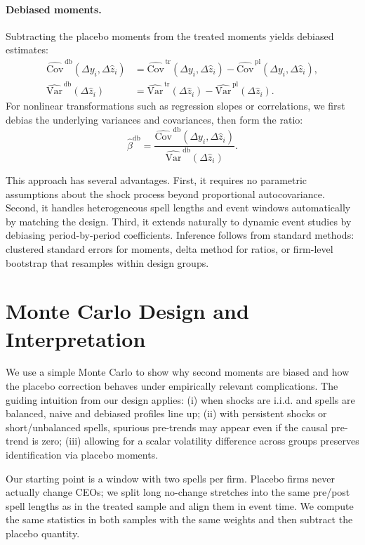 \documentclass[11pt,a4paper]{article}
\newcommand{\Var}{\text{Var}}
\newcommand{\Cov}{\text{Cov}}
\begin{document}
\paragraph{Debiased moments.} Subtracting the placebo moments from the treated moments yields debiased estimates:
\begin{align}
\widehat{\Cov}^{\,\text{db}}(\Delta y_i,\Delta \hat z_i) &= \widehat{\Cov}^{\,\text{tr}}(\Delta y_i,\Delta \hat z_i) - \widehat{\Cov}^{\,\text{pl}}(\Delta y_i,\Delta \hat z_i),\\
\widehat{\Var}^{\,\text{db}}(\Delta \hat z_i) &= \widehat{\Var}^{\,\text{tr}}(\Delta \hat z_i) - \widehat{\Var}^{\,\text{pl}}(\Delta \hat z_i).
\end{align}
For nonlinear transformations such as regression slopes or correlations, we first debias the underlying variances and covariances, then form the ratio:
\begin{equation}
\hat\beta^{\text{db}} = \frac{\widehat{\Cov}^{\,\text{db}}(\Delta y_i,\Delta \hat z_i)}{\widehat{\Var}^{\,\text{db}}(\Delta \hat z_i)}.
\end{equation}

This approach has several advantages. First, it requires no parametric assumptions about the shock process beyond proportional autocovariance. Second, it handles heterogeneous spell lengths and event windows automatically by matching the design. Third, it extends naturally to dynamic event studies by debiasing period-by-period coefficients. Inference follows from standard methods: clustered standard errors for moments, delta method for ratios, or firm-level bootstrap that resamples within design groups.

\section{Monte Carlo Design and Interpretation}

We use a simple Monte Carlo to show why second moments are biased and how the placebo correction behaves under empirically relevant complications. The guiding intuition from our design applies: (i) when shocks are i.i.d. and spells are balanced, naive and debiased profiles line up; (ii) with persistent shocks or short/unbalanced spells, spurious pre-trends may appear even if the causal pre-trend is zero; (iii) allowing for a scalar volatility difference across groups preserves identification via placebo moments.

Our starting point is a window with two spells per firm. Placebo firms never actually change CEOs; we split long no-change stretches into the same pre/post spell lengths as in the treated sample and align them in event time. We compute the same statistics in both samples with the same weights and then subtract the placebo quantity. 
\end{document}
